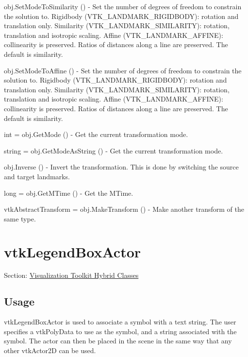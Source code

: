 \begin{DoxyItemize}
\item {\ttfamily obj.\-Set\-Mode\-To\-Similarity ()} -\/ Set the number of degrees of freedom to constrain the solution to. Rigidbody (V\-T\-K\-\_\-\-L\-A\-N\-D\-M\-A\-R\-K\-\_\-\-R\-I\-G\-I\-D\-B\-O\-D\-Y)\-: rotation and translation only. Similarity (V\-T\-K\-\_\-\-L\-A\-N\-D\-M\-A\-R\-K\-\_\-\-S\-I\-M\-I\-L\-A\-R\-I\-T\-Y)\-: rotation, translation and isotropic scaling. Affine (V\-T\-K\-\_\-\-L\-A\-N\-D\-M\-A\-R\-K\-\_\-\-A\-F\-F\-I\-N\-E)\-: collinearity is preserved. Ratios of distances along a line are preserved. The default is similarity.  
\item {\ttfamily obj.\-Set\-Mode\-To\-Affine ()} -\/ Set the number of degrees of freedom to constrain the solution to. Rigidbody (V\-T\-K\-\_\-\-L\-A\-N\-D\-M\-A\-R\-K\-\_\-\-R\-I\-G\-I\-D\-B\-O\-D\-Y)\-: rotation and translation only. Similarity (V\-T\-K\-\_\-\-L\-A\-N\-D\-M\-A\-R\-K\-\_\-\-S\-I\-M\-I\-L\-A\-R\-I\-T\-Y)\-: rotation, translation and isotropic scaling. Affine (V\-T\-K\-\_\-\-L\-A\-N\-D\-M\-A\-R\-K\-\_\-\-A\-F\-F\-I\-N\-E)\-: collinearity is preserved. Ratios of distances along a line are preserved. The default is similarity.  
\item {\ttfamily int = obj.\-Get\-Mode ()} -\/ Get the current transformation mode.  
\item {\ttfamily string = obj.\-Get\-Mode\-As\-String ()} -\/ Get the current transformation mode.  
\item {\ttfamily obj.\-Inverse ()} -\/ Invert the transformation. This is done by switching the source and target landmarks.  
\item {\ttfamily long = obj.\-Get\-M\-Time ()} -\/ Get the M\-Time.  
\item {\ttfamily vtk\-Abstract\-Transform = obj.\-Make\-Transform ()} -\/ Make another transform of the same type.  
\end{DoxyItemize}\hypertarget{vtkhybrid_vtklegendboxactor}{}\section{vtk\-Legend\-Box\-Actor}\label{vtkhybrid_vtklegendboxactor}
Section\-: \hyperlink{sec_vtkhybrid}{Visualization Toolkit Hybrid Classes} \hypertarget{vtkwidgets_vtkxyplotwidget_Usage}{}\subsection{Usage}\label{vtkwidgets_vtkxyplotwidget_Usage}
vtk\-Legend\-Box\-Actor is used to associate a symbol with a text string. The user specifies a vtk\-Poly\-Data to use as the symbol, and a string associated with the symbol. The actor can then be placed in the scene in the same way that any other vtk\-Actor2\-D can be used.

